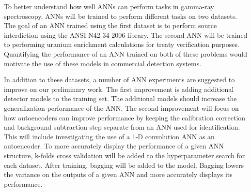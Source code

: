 \documentclass[tocnosub,noragright,centerchapter,12pt,fullpage]{uiucecethesis09}
\begin{document}
To better understand how well ANNs can perform tasks in gamma-ray spectroscopy, ANNs will be trained to perform different tasks on two datasets. The goal of an ANN trained using the first dataset is to perform source interdiction using the ANSI N42-34-2006 library. The second ANN will be trained to performing uranium enrichment calculations for treaty verification purposes. Quantifying the performance of an ANN trained on both of these problems would motivate the use of these models in commercial detection systems.

In addition to these datasets, a number of ANN experiments are suggested to improve on our preliminary work. The first improvement is adding additional detector models to the training set. The additional models should increase the generalization performance of the ANN. The second improvement will focus on how autoencoders can improve performance by keeping the calibration correction and background subtraction step separate from an ANN used for identification. This will include investigating the use of a 1-D convolution ANN as an autoencoder. To more accurately display the performance of a given ANN structure, k-folds cross validation will be added to the hyperparameter search for each dataset. After training, bagging will be added to the model. Bagging lowers the variance on the outputs of a given ANN and more accurately displays its performance.










\end{document}
